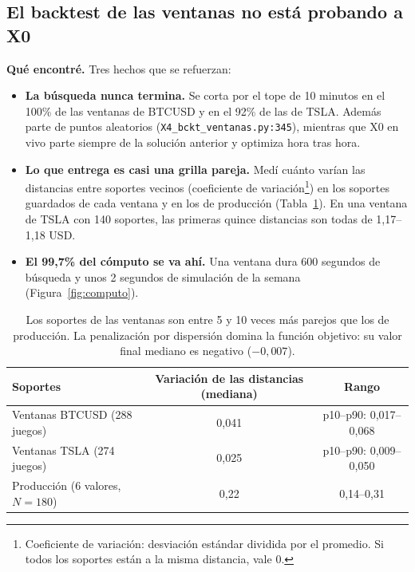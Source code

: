 \documentclass[11pt,a4paper]{article}
\newcommand{\code}[1]{\texttt{\small #1}}
\begin{document}
\subsection{El backtest de las ventanas no está probando a X0}
\label{sec:x0}

\textbf{Qué encontré.} Tres hechos que se refuerzan:
\begin{itemize}[leftmargin=1.2em]
  \item \textbf{La búsqueda nunca termina.} Se corta por el tope de 10 minutos en el 100\% de las ventanas
        de BTCUSD y en el 92\% de las de TSLA. Además parte de puntos aleatorios
        (\code{X4\_bckt\_ventanas.py:345}), mientras que X0 en vivo parte siempre de la solución anterior
        y optimiza hora tras hora.
  \item \textbf{Lo que entrega es casi una grilla pareja.} Medí cuánto varían las distancias entre
        soportes vecinos (coeficiente de variación\footnote{Coeficiente de variación: desviación estándar
        dividida por el promedio. Si todos los soportes están a la misma distancia, vale 0.}) en los
        soportes guardados de cada ventana y en los de producción (Tabla~\ref{tab:escalera}). En una ventana
        de TSLA con 140 soportes, las primeras quince distancias son todas de 1,17--1,18 USD.
  \item \textbf{El 99,7\% del cómputo se va ahí.} Una ventana dura 600 segundos de búsqueda y unos 2
        segundos de simulación de la semana (Figura~\ref{fig:computo}).
\end{itemize}

\begin{table}[h]
\centering\small
\begin{tabular}{lcc}
\toprule
Soportes & Variación de las distancias (mediana) & Rango \\
\midrule
Ventanas BTCUSD (288 juegos) & 0,041 & p10--p90: 0,017--0,068 \\
Ventanas TSLA (274 juegos) & 0,025 & p10--p90: 0,009--0,050 \\
Producción (6 valores, $N = 180$) & 0,22 & 0,14--0,31 \\
\bottomrule
\end{tabular}
\caption{Los soportes de las ventanas son entre 5 y 10 veces más parejos que los de producción. La
penalización por dispersión domina la función objetivo: su valor final mediano es negativo ($-0{,}007$).}
\label{tab:escalera}
\end{table}
\end{document}
